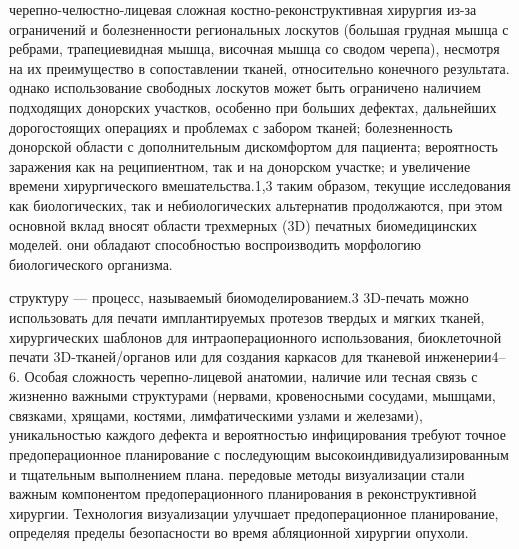черепно-челюстно-лицевая сложная костно-реконструктивная хирургия из-за
ограничений и болезненности региональных лоскутов (большая грудная мышца с
ребрами, трапециевидная мышца, височная мышца со сводом черепа), несмотря на их
преимущество в сопоставлении тканей, относительно конечного результата. однако
использование свободных лоскутов может быть ограничено наличием подходящих
донорских участков, особенно при больших дефектах, дальнейших дорогостоящих
операциях и проблемах с забором тканей; болезненность донорской области с
дополнительным дискомфортом для пациента; вероятность заражения как на
реципиентном, так и на донорском участке; и увеличение времени хирургического
вмешательства.1,3 таким образом, текущие исследования как биологических, так и
небиологических альтернатив продолжаются, при этом основной вклад вносят области
трехмерных (3D) печатных биомедицинских моделей. они обладают способностью
воспроизводить морфологию биологического организма.

структуру — процесс, называемый биомоделированием.3 3D-печать можно использовать
для печати имплантируемых протезов твердых и мягких тканей, хирургических
шаблонов для интраоперационного использования, биоклеточной печати
3D-тканей/органов или для создания каркасов для тканевой инженерии4–6. Особая
сложность черепно-лицевой анатомии, наличие или тесная связь с жизненно важными
структурами (нервами, кровеносными сосудами, мышцами, связками, хрящами,
костями, лимфатическими узлами и железами), уникальностью каждого дефекта и
вероятностью инфицирования требуют точное предоперационное планирование с
последующим высокоиндивидуализированным и тщательным выполнением плана.
передовые методы визуализации стали важным компонентом предоперационного
планирования в реконструктивной хирургии. Технология визуализации улучшает
предоперационное планирование, определяя пределы безопасности во время
абляционной хирургии опухоли.


